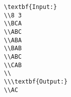 \begin{verbatim}
\textbf{Input:}
\\8 3
\\BCA
\\ABC
\\ABA
\\BAB
\\ABC
\\CAB
\\
\\\textbf{Output:}
\\AC\end{verbatim}